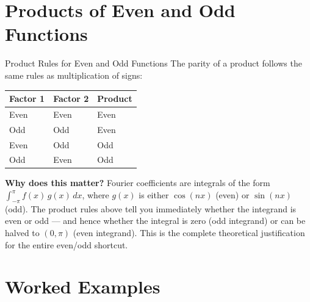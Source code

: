 \documentclass[12pt,a4paper]{article}
\begin{document}
\section{Products of Even and Odd Functions}

\begin{infobox}{Product Rules for Even and Odd Functions}
The parity of a product follows the same rules as multiplication of signs:

\medskip
\begin{center}
\begin{tabular}{@{}lll@{}}
\toprule
\textbf{Factor 1} & \textbf{Factor 2} & \textbf{Product} \\
\midrule
Even & Even & Even \\
Odd  & Odd  & Even \\
Even & Odd  & Odd  \\
Odd  & Even & Odd  \\
\bottomrule
\end{tabular}
\end{center}

\medskip
\textbf{Why does this matter?} Fourier coefficients are integrals of the form
$\int_{-\pi}^{\pi} f(x)\,g(x)\,dx$, where $g(x)$ is either $\cos(nx)$ (even) or $\sin(nx)$
(odd). The product rules above tell you immediately whether the integrand is even or odd ---
and hence whether the integral is zero (odd integrand) or can be halved to $(0,\pi)$
(even integrand). This is the complete theoretical justification for the entire even/odd
shortcut.
\end{infobox}

\section{Worked Examples}
\end{document}
